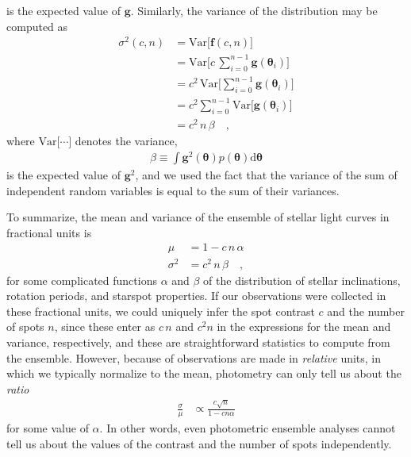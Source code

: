 \documentclass[modern]{aastex62}
\begin{document}
%
is the expected value of $\mathbf{g}$.
%
Similarly, the variance of the distribution may be computed as
%
\begin{align}
    \sigma^2(c, n) & = \mathrm{Var} \Big[ \mathbf{f}(c, n) \Big] \nonumber                         \nonumber \\
                   & = \mathrm{Var} \Big[ c \, \sum_{i=0}^{n-1} \mathbf{g}(\pmb{\theta}_i) \Big]   \nonumber \\
                   & = c^2 \, \mathrm{Var} \Big[ \sum_{i=0}^{n-1} \mathbf{g}(\pmb{\theta}_i) \Big] \nonumber \\
                   & = c^2 \sum_{i=0}^{n-1} \mathrm{Var} \Big[  \mathbf{g}(\pmb{\theta}_i) \Big]   \nonumber \\
                   & = c^2 \, n \, \beta
    \quad,
\end{align}
%
where $\mathrm{Var}\big[\cdots\big]$ denotes the variance,
%
\begin{align}
    \beta \equiv \int \mathbf{g}^2 (\pmb{\theta}) p(\pmb{\theta}) \mathrm{d} \pmb{\theta}
\end{align}
%
is the expected value of $\mathbf{g}^2$, and we used the fact that the variance
of the sum of independent random variables is equal to the sum of their variances.

%

To summarize, the mean and variance of the ensemble of stellar light curves
in fractional units is
%
\begin{align}
    \mu      & = 1 - c \, n \, \alpha
    \nonumber                         \\
    \sigma^2 & = c^2 \, n \, \beta
    \quad,
\end{align}
%
for some complicated functions $\alpha$ and $\beta$ of the distribution of
stellar inclinations,
rotation periods, and starspot properties.
%
If our observations were collected in these fractional units,
we could uniquely infer the spot contrast $c$ and the number of spots $n$,
since these enter as $c \, n$ and $c^2 n$ in the expressions for the mean
and variance, respectively, and these are straightforward statistics to
compute from the ensemble.
%
However, because of observations are made in \emph{relative} units, in which
we typically normalize to the mean, photometry can only tell us about the \emph{ratio}
%
\begin{align}
    \label{eq:ratio}
    \frac{\sigma}{\mu}
     & \propto \frac{c \sqrt{n}}{1 - c n \alpha}
\end{align}
%
for some value of $\alpha$.
In other words, even photometric ensemble analyses cannot tell
us about the values of the contrast and the number of spots independently.
\end{document}
